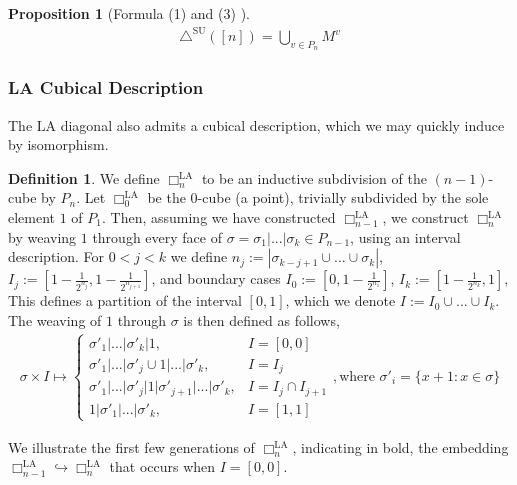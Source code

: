\documentclass{amsart}
\newcommand{\darkblue}{\color{darkblue}} %
\newtheorem{proposition}[theorem]{Proposition}
\theoremstyle{definition}
\newtheorem{definition}[theorem]{Definition}
\newcommand{\defn}[1]{\textsl{\darkblue #1}} %
\newcommand{\LA}{\mathrm{LA}}
\newcommand{\SUD}{\triangle^{\mathrm{SU}}}
\newcommand{\divcube}[1]{\Box_{#1}}
\newcommand{\maxsubdivpairsv}{M^v}
\begin{document}
\begin{proposition}[Formula (1) and (3) \cite{SaneblidzeUmble-comparingDiagonals}]
\begin{align*}
	\SUD([n]) = \bigcup_{v \in P_n} \maxsubdivpairsv
\end{align*}
\end{proposition}

\subsubsection{LA Cubical Description}

The $\LA$ diagonal also admits a cubical description, which we may quickly induce by isomorphism.

\begin{definition}
We define \defn{$\divcube{n}^{\LA}$} to be an inductive subdivision of the $(n-1)$-cube by $P_n$.
Let $\divcube{0}^{\LA}$ be the $0$-cube (a point), trivially subdivided by the sole element $1$ of $P_1$.
Then, assuming we have constructed $\divcube{n-1}^{\LA}$, we construct $\divcube{n}^{\LA}$ by weaving $1$ through every face of $\sigma = \sigma_1|...|\sigma_k \in P_{n-1}$, using an interval description.
For $0<j<k$ we define
$n_j := |\sigma_{k-j+1}\cup...\cup \sigma_k|$, $I_j := [1 - \frac{1}{2^{n_j}}, 1 - \frac{1}{2^{n_{j+1}}}]$, and boundary cases $I_0:= [0,1 - \frac{1}{2^{n_1}}]$, $I_k:= [1 - \frac{1}{2^{n_k}},1]$,
This defines a partition of the interval $[0,1]$, which we denote $I := I_0 \cup ... \cup I_k$.
The weaving of $1$ through $\sigma$ is then defined as follows,
\begin{align} \label{eq:In LA inductive def}
	\sigma \times I \mapsto 
	\begin{cases}
		\sigma'_1|...|\sigma'_k| 1, &I = [0, 0]\\
		\sigma'_1|...|\sigma'_j \cup 1|...|\sigma'_k, &I = I_j\\
		\sigma'_1|...|\sigma'_j|1|\sigma'_{j+1}|...|\sigma'_k, &I = I_j \cap I_{j+1}\\
		1|\sigma'_1|...|\sigma'_k, &I = [1, 1]
	\end{cases}
	, \text{where } \sigma'_i = \{x+1:x\in \sigma\}
\end{align}
\end{definition}

We illustrate the first few generations of $\divcube{n}^{\LA}$, indicating in bold, the embedding $\divcube{n-1}^{\LA}\hookrightarrow \divcube{n}^{\LA}$ that occurs when $I = [0, 0]$.
\end{document}
